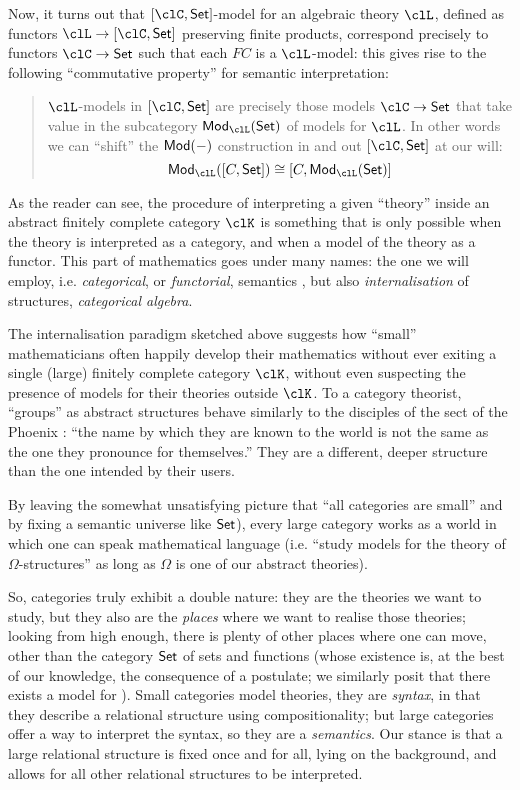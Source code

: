 Now, it turns out that $[\clC,\Set]$-model for an algebraic theory $\clL$, defined as functors $\clL \to [\clC,\Set]$ preserving finite products, correspond precisely to functors $\clC\to \Set$ such that each $FC$ is a $\clL$-model: this gives rise to the following ``commutative property'' for semantic interpretation:
\begin{quote}
    $\clL$-models in $[\clC,\Set]$ are precisely those models $\clC \to \Set$ that take value in the subcategory $\cate{Mod}_{\clL}(\Set)$ of models for $\clL$. In other words we can ``shift'' the $\mathsf{Mod}(-)$ construction in and out $[\clC,\Set]$ at our will:
    \[
        \cate{Mod}_{\clL}([C,\Set]) \cong [C, \cate{Mod}_{\clL}(\Set)]
    \]
\end{quote}
As the reader can see, the procedure of interpreting a given ``theory'' inside an abstract finitely complete category $\clK$ is something that is only possible when the theory is interpreted as a category, and when a model of the theory as a functor. This part of mathematics goes under many names: the one we will employ, i.e. \emph{categorical}, or \emph{functorial}, semantics \cite{lawvere1963functorial}, but also \emph{internalisation} of structures, \emph{categorical algebra}.

The internalisation paradigm sketched above suggests how ``small'' mathematicians often happily develop their mathematics without ever exiting a single (large) finitely complete category $\clK$, without even suspecting the presence of models for their theories outside $\clK$. To a category theorist, ``groups'' as abstract structures behave similarly to the disciples of the sect of the Phoenix \cite{fenix}: ``the name by which they are known to the world
is not the same as the one they pronounce for themselves.'' They are a different, deeper structure than the one intended by their users.

By leaving the somewhat unsatisfying picture that ``all categories are small'' and by fixing a semantic universe like $\mathsf{Set}$), every large category works as a world in which one can speak mathematical language (i.e. ``study models for the theory of $\Omega$-structures'' as long as $\Omega$ is one of our abstract theories).

So, categories truly exhibit a double nature: they are the theories we want to study, but they also are the \emph{places} where we want to realise those theories; looking from high enough, there is plenty of other places where one can move, other than the category $\mathsf{Set}$ of sets and functions (whose existence is, at the best of our knowledge, the consequence of a postulate; we similarly posit that there exists a model for ). Small categories model theories, they are \emph{syntax}, in that they describe a relational structure using compositionality; but large categories offer a way to interpret the syntax, so they are a \emph{semantics}. Our stance is that a large relational structure is fixed once and for all, lying on the background, and allows for all other relational structures to be interpreted.

